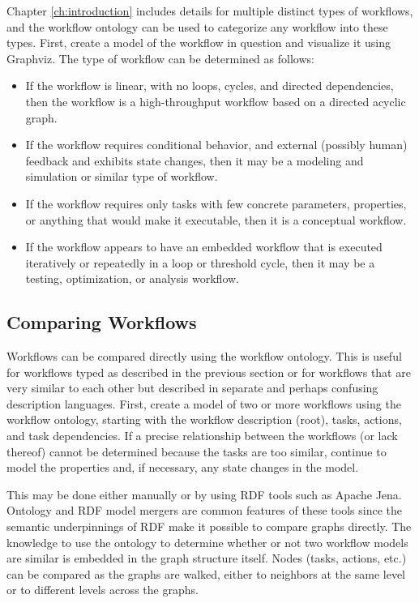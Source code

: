 Chapter \ref{ch:introduction} includes details for multiple distinct types of
workflows, and the workflow ontology can be used to categorize any workflow into
these types. First, create a model of the workflow in question and visualize it
using Graphviz. The type of workflow can be determined as follows:
\begin{itemize}
  \item If the workflow is linear, with no loops, cycles, and directed
  dependencies, then the workflow is a high-throughput workflow based on a
  directed acyclic graph.
  \item If the workflow requires conditional behavior, and external (possibly
  human) feedback and exhibits state changes, then it may be a
  modeling and simulation or similar type of workflow.
  \item If the workflow requires only tasks with few concrete parameters,
  properties, or anything that would make it executable, then it is a conceptual
  workflow.
  \item If the workflow appears to have an embedded workflow that is executed
  iteratively or repeatedly in a loop or threshold cycle, then it may be a
  testing, optimization, or analysis workflow.
\end{itemize}

\subsection{Comparing Workflows}

Workflows can be compared directly using the workflow ontology. This is useful
for workflows typed as described in the previous section or for workflows that
are very similar to each other but described in separate and perhaps confusing
description languages. First, create a model of two or more workflows using the
workflow ontology, starting with the workflow description (root), tasks,
actions, and task dependencies. If a precise relationship between the workflows
(or lack thereof) cannot be determined because the tasks are too similar,
continue to model the properties and, if necessary, any state changes in the
model.

This may be done either manually or by using RDF tools such as Apache Jena.
Ontology and RDF model mergers are common features of these tools since the
semantic underpinnings of RDF make it possible to compare graphs directly. The
knowledge to use the ontology to determine whether or not two workflow models
are similar is embedded in the graph structure itself. Nodes
(tasks, actions, etc.) can be compared as the graphs are walked, either to
neighbors at the same level or to different levels across the graphs.


